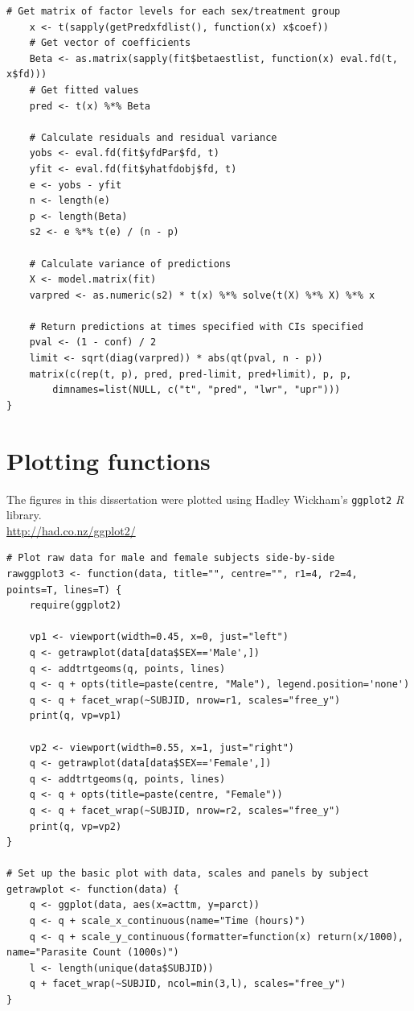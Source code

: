 \begin{singlespace}
\begin{lstlisting}[caption=Functions to calculate fda regression standardized residuals and confidence intervals for fitted values,label=R:fdaresid]
	# Get matrix of factor levels for each sex/treatment group
	x <- t(sapply(getPredxfdlist(), function(x) x$coef))
	# Get vector of coefficients
	Beta <- as.matrix(sapply(fit$betaestlist, function(x) eval.fd(t, x$fd)))
	# Get fitted values
	pred <- t(x) %*% Beta

	# Calculate residuals and residual variance
	yobs <- eval.fd(fit$yfdPar$fd, t)
	yfit <- eval.fd(fit$yhatfdobj$fd, t)
	e <- yobs - yfit
	n <- length(e)
	p <- length(Beta)
	s2 <- e %*% t(e) / (n - p)

	# Calculate variance of predictions
	X <- model.matrix(fit)
	varpred <- as.numeric(s2) * t(x) %*% solve(t(X) %*% X) %*% x

	# Return predictions at times specified with CIs specified
	pval <- (1 - conf) / 2
	limit <- sqrt(diag(varpred)) * abs(qt(pval, n - p))
	matrix(c(rep(t, p), pred, pred-limit, pred+limit), p, p,
		dimnames=list(NULL, c("t", "pred", "lwr", "upr")))
}
\end{lstlisting}

\section{Plotting functions}\label{R:plot}
The figures in this dissertation were plotted using Hadley Wickham's \texttt{ggplot2} \emph{R} library.\\
\url{http://had.co.nz/ggplot2/}
\begin{lstlisting}[caption=Plot raw count data for male and female subjects side-by-side,label=R:rawggplot]
# Plot raw data for male and female subjects side-by-side
rawggplot3 <- function(data, title="", centre="", r1=4, r2=4, points=T, lines=T) {
	require(ggplot2)

	vp1 <- viewport(width=0.45, x=0, just="left")
	q <- getrawplot(data[data$SEX=='Male',])
	q <- addtrtgeoms(q, points, lines)
	q <- q + opts(title=paste(centre, "Male"), legend.position='none')
	q <- q + facet_wrap(~SUBJID, nrow=r1, scales="free_y")
	print(q, vp=vp1)

	vp2 <- viewport(width=0.55, x=1, just="right")
	q <- getrawplot(data[data$SEX=='Female',])
	q <- addtrtgeoms(q, points, lines)
	q <- q + opts(title=paste(centre, "Female"))
	q <- q + facet_wrap(~SUBJID, nrow=r2, scales="free_y")
	print(q, vp=vp2)
}

# Set up the basic plot with data, scales and panels by subject
getrawplot <- function(data) {
	q <- ggplot(data, aes(x=acttm, y=parct))
	q <- q + scale_x_continuous(name="Time (hours)")
	q <- q + scale_y_continuous(formatter=function(x) return(x/1000), name="Parasite Count (1000s)")
	l <- length(unique(data$SUBJID))
	q + facet_wrap(~SUBJID, ncol=min(3,l), scales="free_y")
}


\end{lstlisting}
\end{singlespace}
